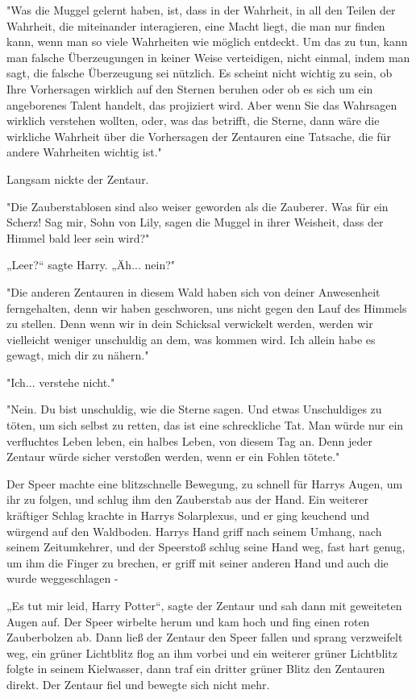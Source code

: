 {"Was die Muggel gelernt haben, ist, dass in der Wahrheit, in all den Teilen der Wahrheit, die miteinander interagieren, eine Macht liegt, die man nur finden kann, wenn man so viele Wahrheiten wie möglich entdeckt. Um das zu tun, kann man falsche Überzeugungen in keiner Weise verteidigen, nicht einmal, indem man sagt, die falsche Überzeugung sei nützlich. Es scheint nicht wichtig zu sein, ob Ihre Vorhersagen wirklich auf den Sternen beruhen oder ob es sich um ein angeborenes Talent handelt, das projiziert wird. Aber wenn Sie das Wahrsagen wirklich verstehen wollten, oder, was das betrifft, die Sterne, dann wäre die wirkliche Wahrheit über die Vorhersagen der Zentauren eine Tatsache, die für andere Wahrheiten wichtig ist."

Langsam nickte der Zentaur.

"Die Zauberstablosen sind also weiser geworden als die Zauberer. Was für ein Scherz! Sag mir, Sohn von Lily, sagen die Muggel in ihrer Weisheit, dass der Himmel bald leer sein wird?"

„Leer?“ sagte Harry. „Äh... nein?"

"Die anderen Zentauren in diesem Wald haben sich von deiner Anwesenheit ferngehalten, denn wir haben geschworen, uns nicht gegen den Lauf des Himmels zu stellen. Denn wenn wir in dein Schicksal verwickelt werden, werden wir vielleicht weniger unschuldig an dem, was kommen wird. Ich allein habe es gewagt, mich dir zu nähern."

"Ich... verstehe nicht."

"Nein. Du bist unschuldig, wie die Sterne sagen. Und etwas Unschuldiges zu töten, um sich selbst zu retten, das ist eine schreckliche Tat. Man würde nur ein verfluchtes Leben leben, ein halbes Leben, von diesem Tag an. Denn jeder Zentaur würde sicher verstoßen werden, wenn er ein Fohlen tötete."

Der Speer machte eine blitzschnelle Bewegung, zu schnell für Harrys Augen, um ihr zu folgen, und schlug ihm den Zauberstab aus der Hand. Ein weiterer kräftiger Schlag krachte in Harrys Solarplexus, und er ging keuchend und würgend auf den Waldboden. Harrys Hand griff nach seinem Umhang, nach seinem Zeitumkehrer, und der Speerstoß schlug seine Hand weg, fast hart genug, um ihm die Finger zu brechen, er griff mit seiner anderen Hand und auch die wurde weggeschlagen -

„Es tut mir leid, Harry Potter“, sagte der Zentaur und sah dann mit geweiteten Augen auf. Der Speer wirbelte herum und kam hoch und fing einen roten Zauberbolzen ab. Dann ließ der Zentaur den Speer fallen und sprang verzweifelt weg, ein grüner Lichtblitz flog an ihm vorbei und ein weiterer grüner Lichtblitz folgte in seinem Kielwasser, dann traf ein dritter grüner Blitz den Zentauren direkt. Der Zentaur fiel und bewegte sich nicht mehr.

}
